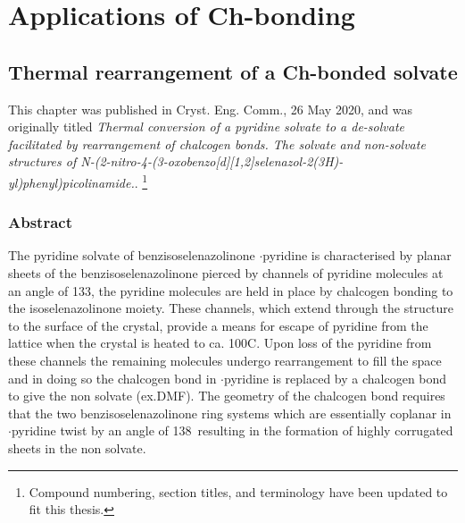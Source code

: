 \part{Applications of Ch-bonding}

\begin{refsection}

\chapter{Thermal rearrangement of a Ch-bonded solvate}
\label{sec:thermal-conversion}

This chapter was published in Cryst. Eng. Comm., 26 May 2020, and was originally titled \emph{Thermal conversion of a pyridine solvate to a de-solvate facilitated by rearrangement of chalcogen bonds. The solvate and non-solvate structures of N-(2-nitro-4-(3-oxobenzo[\emph{d}][1,2]selenazol-2(3\emph{H})-yl)phenyl)picolinamide.}\autocite{Fellowes2020a}. \footnote{Compound numbering, section titles, and terminology have been updated to fit this thesis.}

\section{Abstract}
The pyridine solvate of benzisoselenazolinone $\cdot$pyridine is characterised by planar sheets of the benzisoselenazolinone  pierced by channels of pyridine molecules at an angle of 133\degree, the pyridine molecules are held in place by  chalcogen bonding to the isoselenazolinone moiety.
These channels, which extend through the structure to the surface of the crystal, provide a means for escape of pyridine from the lattice when the crystal is heated to ca. 100\degree C.
Upon loss of the pyridine from these channels the remaining molecules undergo rearrangement to fill the space and in doing so the  chalcogen bond in $\cdot$pyridine is replaced by a  chalcogen bond to give the non solvate (ex.DMF).
The geometry of the chalcogen bond requires that the two benzisoselenazolinone ring systems which are essentially coplanar in $\cdot$pyridine twist by an angle of 138\degree~resulting in the formation of highly corrugated sheets in the non solvate.


\end{refsection}
